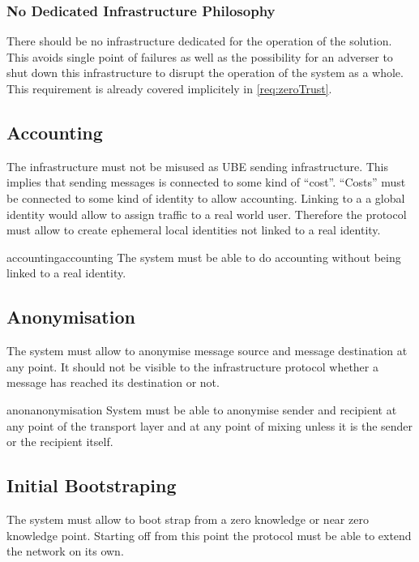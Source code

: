 \subsubsection{No Dedicated Infrastructure Philosophy}
There should be no infrastructure dedicated for the operation of the solution. This avoids single point of failures as well as the possibility for an adverser to shut down this infrastructure to disrupt the operation of the system as a whole. This requirement is already covered implicitely in \ref{req:zeroTrust}.

\subsection{Accounting}
The infrastructure must not be misused as UBE sending infrastructure. This implies that sending messages is connected to some kind of ``cost''. ``Costs'' must be connected to some kind of identity to allow accounting. Linking to a a global identity would allow to assign traffic to a real world user. Therefore the protocol must allow to create ephemeral local identities not linked to a real identity.

\begin{requirement}{accounting}{accounting}
	The system must be able to do accounting without being linked to a real identity.
\end{requirement}

\subsection{Anonymisation}
The system must allow to anonymise message source and message destination at any point. It should not be visible to the infrastructure protocol whether a message has reached its destination or not. 

\begin{requirement}{anon}{anonymisation}
	System must be able to anonymise sender and recipient at any point of the transport layer and at any point of mixing unless it is the sender or the recipient itself.
\end{requirement}

\subsection{Initial Bootstraping}
The system must allow to boot strap from a zero knowledge or near zero knowledge point. Starting off from this point the protocol must be able to extend the network on its own.

